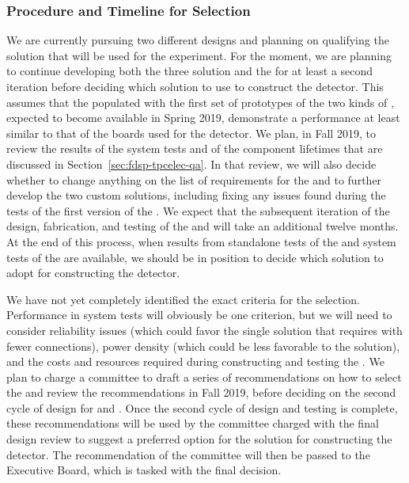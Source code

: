 \subsubsection{Procedure and Timeline for  Selection}
\label{sec:fdsp-tpcelec-design-femb-selection}

We are currently pursuing two different  designs and 
planning on qualifying the   solution that 
will be used for the  experiment. For the moment, we 
are planning to continue developing both the three  
solution and the   for at least a second 
iteration before deciding which  solution to use to 
construct the   detector. This assumes that 
the  populated with the first set of prototypes of 
the two kinds of , expected to become available in 
Spring 2019, demonstrate a performance at least similar to that 
of the boards used for the  detector. We plan, in Fall 
2019, to review the results of the system tests and of the
component lifetimes that are discussed in Section~\ref{sec:fdsp-tpcelec-qa}. 
In that review, we will also decide whether to change anything on 
the list of requirements for the  and to further develop
the two custom  solutions, including fixing any 
issues found during the tests of the first version of the 
. We expect that the subsequent iteration
of the design, fabrication, and testing of the  and
 will take an additional twelve months. At the end 
of this process, when results from standalone tests of the
 and system tests of the  are
available, we should be in position to decide which 
solution to adopt for constructing the   detector.

We have not yet completely identified the exact criteria for the 
 selection. Performance in system tests will obviously
be one criterion, but we will need to consider reliability 
issues (which could favor the single  solution 
that requires  with fewer connections), power 
density (which could be less favorable to the  solution),
and the costs and resources required during constructing
and testing the . We plan to charge a committee
to draft a series of recommendations on how to select the
 and review the recommendations in Fall
2019, before deciding on the second cycle of design for
 and . Once the second cycle of design
and testing is complete, these recommendations will be used by the
committee charged with the final design review to suggest a
preferred option for the  solution for constructing 
the   detector. The recommendation of
the committee will then be passed to the  Executive Board,
which is tasked with the final  decision.

